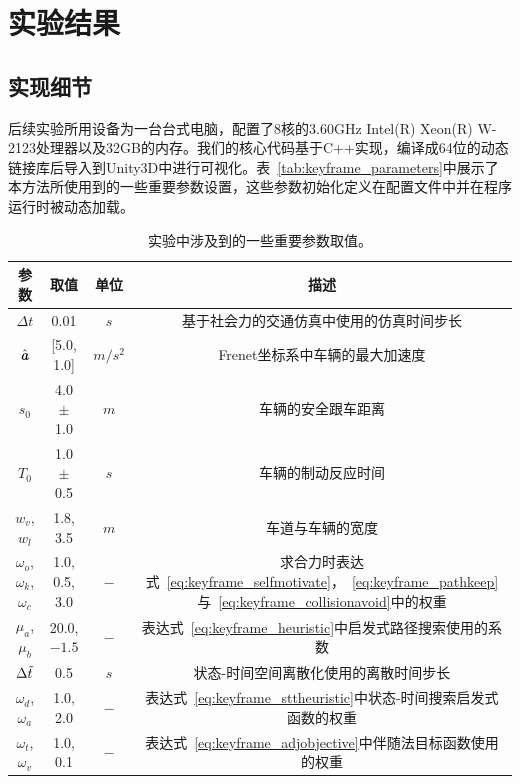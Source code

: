 \section{实验结果}

\subsection{实现细节}
后续实验所用设备为一台台式电脑，配置了8核的3.60GHz Intel(R) Xeon(R) W-2123处理器以及32GB的内存。我们的核心代码基于C++实现，编译成64位的动态链接库后导入到Unity3D中进行可视化。表~\ref{tab:keyframe_parameters}中展示了本方法所使用到的一些重要参数设置，这些参数初始化定义在配置文件中并在程序运行时被动态加载。


\begin{table}[!htb]
\setlength{\belowcaptionskip}{.4cm}
\centering
\normalsize
\renewcommand\arraystretch{1.5}
\caption[实验中一些重要参数的取值]{实验中涉及到的一些重要参数取值。}
\begin{tabular}{|c|c|c|c|}

\hline
\textbf{参数}                   & \textbf{取值}         & \textbf{单位}     & \textbf{描述}                               \\ \hline
$\Delta{t}$               & 0.01          & $s$     & 基于社会力的交通仿真中使用的仿真时间步长                                \\ \hline
$\hat{\textbf{\emph{a}}}$ & [5.0, 1.0]    & $m/s^2$ & Frenet坐标系中车辆的最大加速度                                       \\ \hline
$s_0$                     & 4.0 $\pm$ 1.0 & $m$     & 车辆的安全跟车距离                                                  \\ \hline
$T_0$                     & 1.0 $\pm$ 0.5 & $s$     & 车辆的制动反应时间                                                  \\ \hline
$w_v$, $w_l$              & 1.8, 3.5      & $m$     & 车道与车辆的宽度                                                    \\ \hline
$\omega_o$, $\omega_k$, $\omega_c$ &
  1.0, 0.5, 3.0 &
  $-$ &
  求合力时表达式~\ref{eq:keyframe_selfmotivate}，~\ref{eq:keyframe_pathkeep}与~\ref{eq:keyframe_collisionavoid}中的权重 \\ \hline
$\mu_a$, $\mu_b$          & 20.0, $-1.5$    & $-$       & 表达式~\ref{eq:keyframe_heuristic}中启发式路径搜索使用的系数 \\ \hline
$\Delta{\Tilde{t}}$       & 0.5           & $s$     & 状态-时间空间离散化使用的离散时间步长                                   \\ \hline
$\omega_d$, $\omega_a$    & 1.0, 2.0      & 
$-$       & 表达式~\ref{eq:keyframe_sttheuristic}中状态-时间搜索启发式函数的权重  \\ \hline
$\omega_t$, $\omega_v$ & 1.0, 0.1 & $-$ & 表达式~\ref{eq:keyframe_adjobjective}中伴随法目标函数使用的权重 \\ \hline


\end{tabular}
\end{table}
